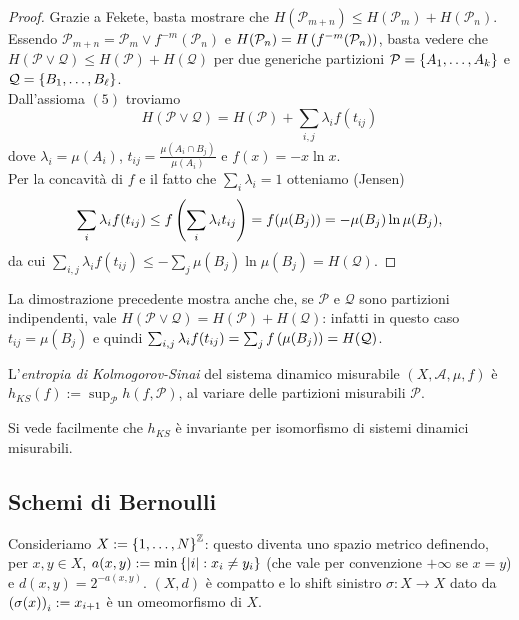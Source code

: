 \begin{proof}Grazie a Fekete, basta mostrare che $H(\mathcal{P}_{m+n})\le H(\mathcal{P}_m)+H(\mathcal{P}_n)$.
Essendo $\mathcal{P}_{m+n}=\mathcal{P}_m\vee f^{-m}(\mathcal{P}_n)$ e $H(\mathcal{P}_n)=H\left(f^{-m}(\mathcal{P}_n)\right)$,
basta vedere che $H(\mathcal{P}\vee\mathcal{Q})\le H(\mathcal{P})+H(\mathcal{Q})$ per due generiche
partizioni $\mathcal{P}=\left\{A_1,\dots,A_k\right\}$ e $\mathcal{Q}=\left\{B_1,\dots,B_\ell\right\}$. \\
Dall'assioma $(5)$ troviamo
\[ H(\mathcal{P}\vee\mathcal{Q})=H(\mathcal{P})+\sum_{i,j}\lambda_i f(t_{ij}) \]
dove $\lambda_i=\mu(A_i)$, $t_{ij}=\frac{\mu(A_i\cap B_j)}{\mu(A_i)}$ e $f(x)=-x\ln x$. \\
Per la concavità di $f$ e il fatto che $\sum_i\lambda_i=1$ otteniamo (Jensen)
\[ \sum_i \lambda_i f(t_{ij})\le f\left(\sum_i\lambda_i t_{ij}\right)=f(\mu(B_j))=-\mu(B_j)\ln\mu(B_j), \]
da cui $\sum_{i,j}\lambda_i f(t_{ij})\le -\sum_j \mu(B_j)\ln\mu(B_j)=H(\mathcal{Q})$.
\end{proof}

\begin{oss}La dimostrazione precedente mostra anche che, se $\mathcal{P}$ e $\mathcal{Q}$ sono partizioni indipendenti,
vale $H(\mathcal{P}\vee\mathcal{Q})=H(\mathcal{P})+H(\mathcal{Q})$: infatti in questo caso $t_{ij}=\mu(B_j)$
e quindi $\sum_{i,j}\lambda_i f(t_{ij})=\sum_j f\left(\mu(B_j)\right)=H(\mathcal{Q})$.
\end{oss}

\begin{defi}L'\emph{entropia di Kolmogorov-Sinai} del sistema dinamico misurabile $(X,\mathcal{A},\mu,f)$ è
$h_{KS}(f):=\sup_{\mathcal{P}}h(f,\mathcal{P})$, al variare delle partizioni misurabili $\mathcal{P}$.
\end{defi}

\begin{oss}Si vede facilmente che $h_{KS}$ è invariante per isomorfismo di sistemi dinamici misurabili.
\end{oss}

\subsection{Schemi di Bernoulli}


Consideriamo $X:=\left\{1,\dots,N\right\}^{\mathbb{Z}}$: questo diventa uno spazio metrico definendo, per $x,y\in X$, $a(x,y):=\min\left\{\left|i\right|:x_i\neq y_i\right\}$ 
(che vale per convenzione $+\infty$ se $x=y$) e $d(x,y)=2^{-a(x,y)}$. $(X,d)$ è compatto e lo shift sinistro $\sigma:X\to X$ dato da $\left(\sigma(x)\right)_i:=x_{i+1}$ è un omeomorfismo di $X$.

